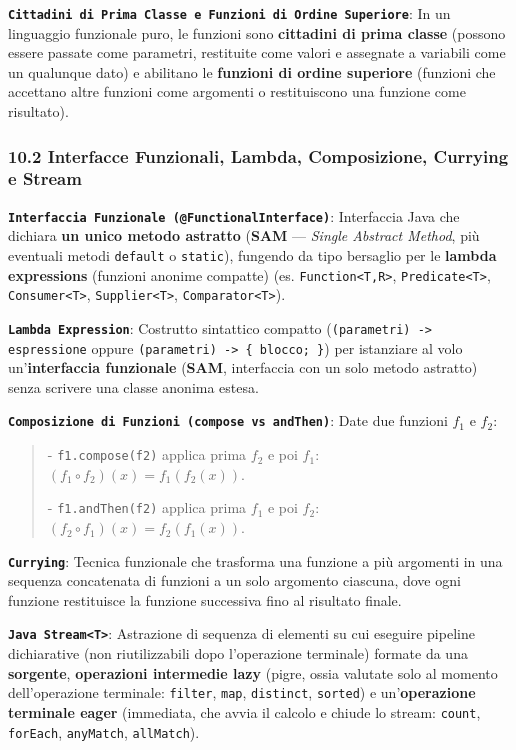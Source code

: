 \textbf{\texttt{Cittadini di Prima Classe e Funzioni di Ordine Superiore}}: In un linguaggio funzionale puro, le funzioni sono \textbf{cittadini di prima classe} (possono essere passate come parametri, restituite come valori e assegnate a variabili come un qualunque dato) e abilitano le \textbf{funzioni di ordine superiore} (funzioni che accettano altre funzioni come argomenti o restituiscono una funzione come risultato).

\subsubsection{10.2 Interfacce Funzionali, Lambda, Composizione, Currying e Stream}\label{10-2-interfacce-funzionali-lambda-composizione-currying-e-stream}

\textbf{\texttt{Interfaccia Funzionale (@FunctionalInterface)}}: Interfaccia Java che dichiara \textbf{un unico metodo astratto} (\textbf{SAM} — \emph{Single Abstract Method}, più eventuali metodi \texttt{default} o \texttt{static}), fungendo da tipo bersaglio per le \textbf{lambda expressions} (funzioni anonime compatte) (es. \texttt{Function<T,R>}, \texttt{Predicate<T>}, \texttt{Consumer<T>}, \texttt{Supplier<T>}, \texttt{Comparator<T>}).

\textbf{\texttt{Lambda Expression}}: Costrutto sintattico compatto (\texttt{(parametri) -> espressione} oppure \texttt{(parametri) -> \{ blocco; \}}) per istanziare al volo un'\textbf{interfaccia funzionale} (\textbf{SAM}, interfaccia con un solo metodo astratto) senza scrivere una classe anonima estesa.

\textbf{\texttt{Composizione di Funzioni (compose vs andThen)}}: Date due funzioni $f_1$ e $f_2$:

\begin{quote}\small



- \texttt{f1.compose(f2)} applica prima $f_2$ e poi $f_1$: $(f_1 \circ f_2)(x) = f_1(f_2(x))$.

- \texttt{f1.andThen(f2)} applica prima $f_1$ e poi $f_2$: $(f_2 \circ f_1)(x) = f_2(f_1(x))$.

\end{quote}

\textbf{\texttt{Currying}}: Tecnica funzionale che trasforma una funzione a più argomenti in una sequenza concatenata di funzioni a un solo argomento ciascuna, dove ogni funzione restituisce la funzione successiva fino al risultato finale.

\textbf{\texttt{Java Stream<T>}}: Astrazione di sequenza di elementi su cui eseguire pipeline dichiarative (non riutilizzabili dopo l'operazione terminale) formate da una \textbf{sorgente}, \textbf{operazioni intermedie lazy} (pigre, ossia valutate solo al momento dell'operazione terminale: \texttt{filter}, \texttt{map}, \texttt{distinct}, \texttt{sorted}) e un'\textbf{operazione terminale eager} (immediata, che avvia il calcolo e chiude lo stream: \texttt{count}, \texttt{forEach}, \texttt{anyMatch}, \texttt{allMatch}).

